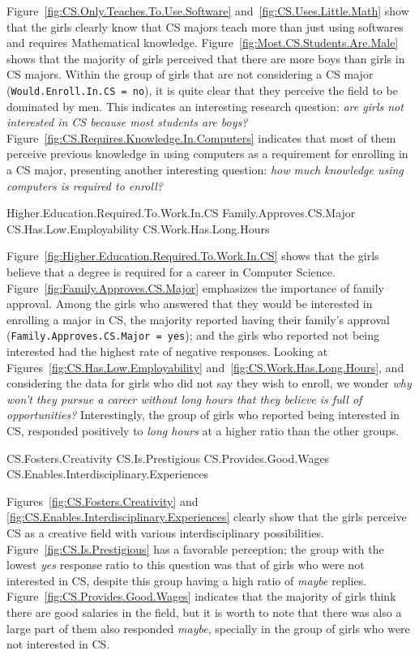 Figure~\ref{fig:CS.Only.Teaches.To.Use.Software} and~\ref{fig:CS.Uses.Little.Math} show that the girls clearly know that CS majors teach more than just using softwares and requires Mathematical knowledge. Figure~\ref{fig:Most.CS.Students.Are.Male} shows that the majority of girls perceived that there are more boys than girls in CS majors. Within the group of girls that are not considering a CS major (\texttt{Would.Enroll.In.CS = no}), it is quite clear that they perceive the field to be dominated by men. This indicates an interesting research question: \emph{are girls not interested in CS because most students are boys?} Figure~\ref{fig:CS.Requires.Knowledge.In.Computers} indicates that most of them perceive previous knowledge in using computers as a requirement for enrolling in a CS major, presenting another interesting question: \emph{how much knowledge using computers is required to enroll?}

    {Higher.Education.Required.To.Work.In.CS}
    {Family.Approves.CS.Major}
    {CS.Has.Low.Employability}
    {CS.Work.Has.Long.Hours}%

Figure~\ref{fig:Higher.Education.Required.To.Work.In.CS} shows that the girls believe that a degree is required for a career in Computer Science. Figure~\ref{fig:Family.Approves.CS.Major} emphasizes the importance of family approval. Among the girls who answered that they would be interested in enrolling a major in CS, the majority reported having their family's approval (\texttt{Family.Approves.CS.Major = yes}); and the girls who reported not being interested had the highest rate of negative responses. Looking at Figures~\ref{fig:CS.Has.Low.Employability} and~\ref{fig:CS.Work.Has.Long.Hours}, and considering the data for girls who did not say they wish to enroll, we wonder \emph{why won't they pursue a career without long hours that they believe is full of opportunities?}
Interestingly, the group of girls who reported being interested in CS, responded positively to \emph{long hours} at a higher ratio than the other groups.

    {CS.Fosters.Creativity}
    {CS.Is.Prestigious}
    {CS.Provides.Good.Wages}
    {CS.Enables.Interdisciplinary.Experiences}%

Figures~\ref{fig:CS.Fosters.Creativity} and \ref{fig:CS.Enables.Interdisciplinary.Experiences} clearly show that the girls perceive CS as a creative field with various interdisciplinary possibilities. Figure~\ref{fig:CS.Is.Prestigious} has a favorable perception; the group with the lowest \emph{yes} response ratio to this question was that of girls who were not interested in CS, despite this group having a high ratio of \emph{maybe} replies. Figure~\ref{fig:CS.Provides.Good.Wages} indicates that the majority of girls think there are good salaries in the field, but it is worth to note that there was also a large part of them also responded \emph{maybe}, specially in the group of girls who were not interested in CS.


